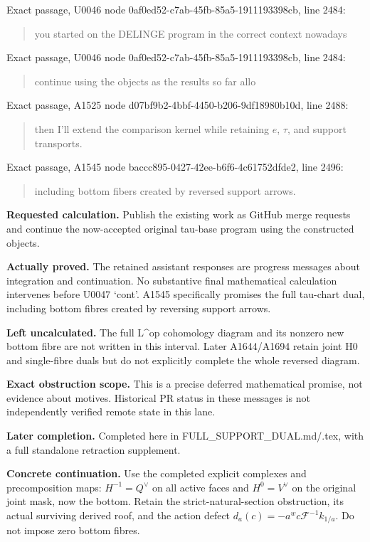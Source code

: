 Exact passage, U0046 node 0af0ed52-c7ab-45fb-85a5-1911193398cb, line
2484:

\begin{quote}
you started on the DELINGE program in the correct context nowadays
\end{quote}

Exact passage, U0046 node 0af0ed52-c7ab-45fb-85a5-1911193398cb, line
2484:

\begin{quote}
continue using the objects as the results so far allo
\end{quote}

Exact passage, A1525 node d07bf9b2-4bbf-4450-b206-9df18980b10d, line
2488:

\begin{quote}
then I'll extend the comparison kernel while retaining \(e\), \(\tau\),
and support transports.
\end{quote}

Exact passage, A1545 node baccc895-0427-42ee-b6f6-4c61752dfde2, line
2496:

\begin{quote}
including bottom fibers created by reversed support arrows.
\end{quote}

\textbf{Requested calculation.} Publish the existing work as GitHub
merge requests and continue the now-accepted original tau-base program
using the constructed objects.

\textbf{Actually proved.} The retained assistant responses are progress
messages about integration and continuation. No substantive final
mathematical calculation intervenes before U0047 `cont'. A1545
specifically promises the full tau-chart dual, including bottom fibres
created by reversing support arrows.

\textbf{Left uncalculated.} The full L\^{}op cohomology diagram and its
nonzero new bottom fibre are not written in this interval. Later
A1644/A1694 retain joint H0 and single-fibre duals but do not explicitly
complete the whole reversed diagram.

\textbf{Exact obstruction scope.} This is a precise deferred
mathematical promise, not evidence about motives. Historical PR status
in these messages is not independently verified remote state in this
lane.

\textbf{Later completion.} Completed here in
FULL\_SUPPORT\_DUAL.md/.tex, with a full standalone retraction
supplement.

\textbf{Concrete continuation.} Use the completed explicit complexes and
precomposition maps: \(H^{-1}=Q^\vee\) on all active faces and
\(H^0=V^\vee\) on the original joint mask, now the bottom. Retain the
strict-natural-section obstruction, its actual surviving derived roof,
and the action defect \(d_a(c)=-a^w c\mathcal F^{-1}k_{1/a}\). Do not
impose zero bottom fibres.

